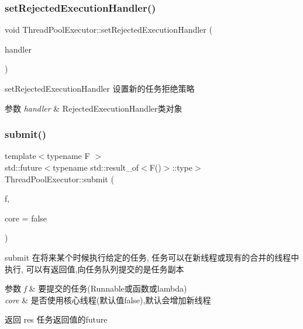 \subsubsection{\texorpdfstring{set\+Rejected\+Execution\+Handler()}{setRejectedExecutionHandler()}}
{\footnotesize\ttfamily void Thread\+Pool\+Executor\+::set\+Rejected\+Execution\+Handler (\begin{DoxyParamCaption}\item[{\hyperlink{classRejectedExecutionHandler}{Rejected\+Execution\+Handler}}]{handler }\end{DoxyParamCaption})}



set\+Rejected\+Execution\+Handler 设置新的任务拒绝策略 


\begin{DoxyParams}{参数}
{\em handler} & Rejected\+Execution\+Handler类对象 \\
\hline
\end{DoxyParams}
\mbox{\label{classThreadPoolExecutor_aaaef92fe45f7f5a8b659187c15881ca3}} 
\subsubsection{\texorpdfstring{submit()}{submit()}}
{\footnotesize\ttfamily template$<$typename F $>$ \\
std\+::future$<$typename std\+::result\+\_\+of$<$F()$>$\+::type$>$ Thread\+Pool\+Executor\+::submit (\begin{DoxyParamCaption}\item[{F}]{f,  }\item[{bool}]{core = {\ttfamily false} }\end{DoxyParamCaption})\hspace{0.3cm}{\ttfamily [inline]}}



submit 在将来某个时候执行给定的任务, 任务可以在新线程或现有的合并的线程中执行, 可以有返回值,向任务队列提交的是任务副本 


\begin{DoxyParams}{参数}
{\em f} & 要提交的任务(Runnable或函数或lambda) \\
\hline
{\em core} & 是否使用核心线程(默认值false),默认会增加新线程\\
\hline
\end{DoxyParams}
\begin{DoxyReturn}{返回}
res 任务返回值的future 
\end{DoxyReturn}
\mbox{\label{classThreadPoolExecutor_af85a124c9169a546bfbd725725024527}} 
